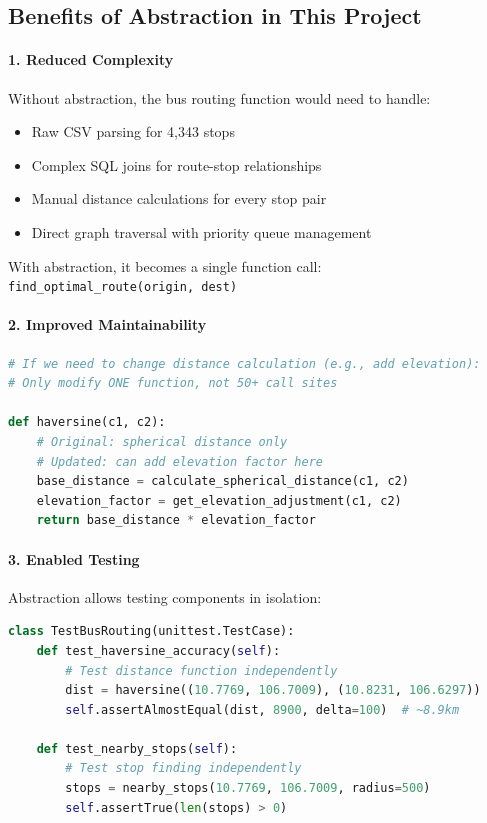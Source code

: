 \subsection{Benefits of Abstraction in This Project}

\paragraph{1. Reduced Complexity}
Without abstraction, the bus routing function would need to handle:
\begin{itemize}[noitemsep]
    \item Raw CSV parsing for 4,343 stops
    \item Complex SQL joins for route-stop relationships
    \item Manual distance calculations for every stop pair
    \item Direct graph traversal with priority queue management
\end{itemize}
With abstraction, it becomes a single function call: \texttt{find\_optimal\_route(origin, dest)}

\paragraph{2. Improved Maintainability}
\begin{lstlisting}[language=Python, caption={Abstraction Enables Easy Updates}]
# If we need to change distance calculation (e.g., add elevation):
# Only modify ONE function, not 50+ call sites

def haversine(c1, c2):
    # Original: spherical distance only
    # Updated: can add elevation factor here
    base_distance = calculate_spherical_distance(c1, c2)
    elevation_factor = get_elevation_adjustment(c1, c2)
    return base_distance * elevation_factor
\end{lstlisting}

\paragraph{3. Enabled Testing}
Abstraction allows testing components in isolation:
\begin{lstlisting}[language=Python, caption={Abstraction Enables Unit Testing}]
class TestBusRouting(unittest.TestCase):
    def test_haversine_accuracy(self):
        # Test distance function independently
        dist = haversine((10.7769, 106.7009), (10.8231, 106.6297))
        self.assertAlmostEqual(dist, 8900, delta=100)  # ~8.9km
    
    def test_nearby_stops(self):
        # Test stop finding independently
        stops = nearby_stops(10.7769, 106.7009, radius=500)
        self.assertTrue(len(stops) > 0)
\end{lstlisting}

